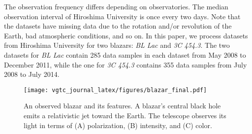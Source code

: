 The observation frequency differs depending on observatories.
The median observation interval of Hiroshima University is once every two days.
Note that the datasets have missing data due to the rotation and/or revolution of the Earth, bad atmospheric conditions, and so on.
In this paper, we process datasets from Hiroshima University for two blazars: \emph{BL Lac} and \emph{3C 454.3}. 
The two datasets for \emph{BL Lac} contain 285 data samples in each dataset from May 2008 to December 2011, while the one for \emph{3C 454.3} contains 355 data samples from July 2008 to July 2014.


\begin{figure}[tb]
    \centering
        \texttt{[image: vgtc\_journal\_latex/figures/blazar\_final.pdf]}
    \caption{An observed blazar and its features. A blazar's central black hole emits a relativistic jet toward the Earth.
        The telescope observes its light in terms of (A) polarization, (B) intensity, and (C) color.}
    \label{fig:blazar}
\end{figure}


